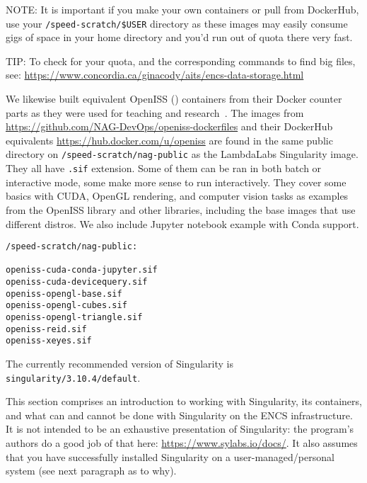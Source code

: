 NOTE: It is important if you make your own containers or pull from
DockerHub, use your \verb+/speed-scratch/$USER+ directory as these
images may easily consume gigs of space in your home directory
and you'd run out of quota there very fast.

TIP: To check for your quota, and the corresponding commands
to find big files, see: \url{https://www.concordia.ca/ginacody/aits/encs-data-storage.html}

We likewise built equivalent OpenISS ()
containers from their Docker counter parts as they were used for teaching and
research~\cite{oi-containers-poster-siggraph2023}. The
images from \url{https://github.com/NAG-DevOps/openiss-dockerfiles}
and their DockerHub equivalents \url{https://hub.docker.com/u/openiss}
are found in the same public directory on \verb+/speed-scratch/nag-public+
as the LambdaLabs Singularity image. They all have \texttt{.sif} extension.
Some of them can be ran in both batch or interactive mode, some
make more sense to run interactively. They cover some basics with CUDA,
OpenGL rendering, and computer vision tasks as examples from the OpenISS
library and other libraries, including the base images that use different
distros. We also include Jupyter notebook example with Conda support.

\begin{verbatim}
/speed-scratch/nag-public:

openiss-cuda-conda-jupyter.sif
openiss-cuda-devicequery.sif
openiss-opengl-base.sif
openiss-opengl-cubes.sif
openiss-opengl-triangle.sif
openiss-reid.sif
openiss-xeyes.sif
\end{verbatim}

The currently recommended version of Singularity is
\texttt{singularity/3.10.4/default}.

This section comprises an introduction to working with Singularity, its 
containers, and what can and cannot be done with Singularity on the ENCS 
infrastructure. It is not intended to be an exhaustive presentation of 
Singularity: the program's authors do a good job of that here:
\url{https://www.sylabs.io/docs/}. It also assumes that you have successfully installed 
Singularity on a user-managed/personal system (see next paragraph as to why).

